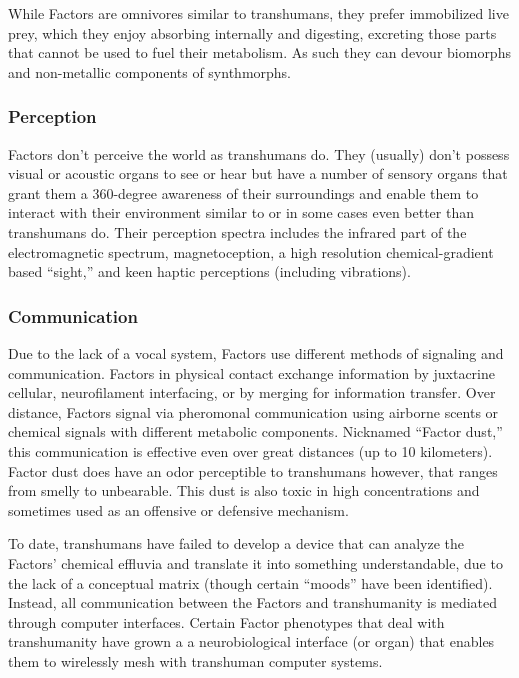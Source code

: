 While Factors are omnivores similar to transhumans, they prefer immobilized live prey, which they enjoy absorbing internally and digesting, excreting those parts that cannot be used to fuel their metabolism. As such they can devour biomorphs and non-metallic components of synthmorphs. 

\subsubsection{Perception } 

Factors don't perceive the world as transhumans do. They (usually) don't possess visual or acoustic organs to see or hear but have a number of sensory organs that grant them a 360-degree awareness of their surroundings and enable them to interact with their environment similar to or in some cases even better than transhumans do. Their perception spectra includes the infrared part of the electromagnetic spectrum, magnetoception, a high resolution chemical-gradient based ``sight,'' and keen haptic perceptions (including vibrations). 

\subsubsection{Communication } 

Due to the lack of a vocal system, Factors use different methods of signaling and communication. Factors in physical contact exchange information by juxtacrine cellular, neurofilament interfacing, or by merging for information transfer. Over distance, Factors signal via pheromonal communication using airborne scents or chemical signals with different metabolic components. Nicknamed ``Factor dust,'' this communication is effective even over great distances (up to 10 kilometers). Factor dust does have an odor perceptible to transhumans however, that ranges from smelly to unbearable. This dust is also toxic in high concentrations and sometimes used as an offensive or defensive mechanism. 

To date, transhumans have failed to develop a device that can analyze the Factors' chemical effluvia and translate it into something understandable, due to the lack of a conceptual matrix (though certain ``moods'' have been identified). Instead, all communication between the Factors and transhumanity is mediated through computer interfaces. Certain Factor phenotypes that deal with transhumanity have grown a a neurobiological interface (or organ) that enables them to wirelessly mesh with transhuman computer systems. 

